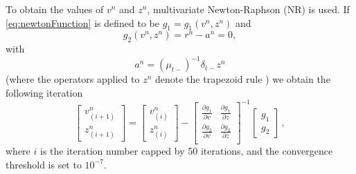 \documentclass[twoside,a4paper,dvipsnames]{article}
\begin{document}
To obtain the values of $v^n$ and $z^n$, multivariate Newton-Raphson (NR) is used. If \eqref{eq:newtonFunction} is defined to be $g_1  = g_1(v^n, z^n)$ and 
\begin{equation}\label{eq:g2}
   g_2(v^n, z^n) = r^n - a^n = 0,
\end{equation}
with
\begin{equation}\label{eq:an}
    a^n = (\mu_{t-})^{-1}\delta_{t-} z^n
\end{equation}
(where the operators applied to $z^n$ denote the trapezoid rule \cite{Bilbao2009}) we obtain the following iteration 
\begin{equation}\label{eq:NRit}
    \begin{bmatrix}
    v_{(i+1)}^n\\
    z_{(i+1)}^n
    \end{bmatrix}
    =
    \begin{bmatrix}
    v_{(i)}^n\\
    z_{(i)}^n
    \end{bmatrix}
    -
    \begin{bmatrix}
    \frac{\partial g_1}{\partial v} & \frac{\partial g_1}{\partial z}\\
    \frac{\partial g_2}{\partial v} & \frac{\partial g_2}{\partial z}\\
    \end{bmatrix}^{-1}
    \begin{bmatrix}
    g_1\\
    g_2
    \end{bmatrix}\,
    ,
\end{equation}
where $i$ is the iteration number capped by 50 iterations, and the convergence threshold is set to $10^{-7}$.
\end{document}
